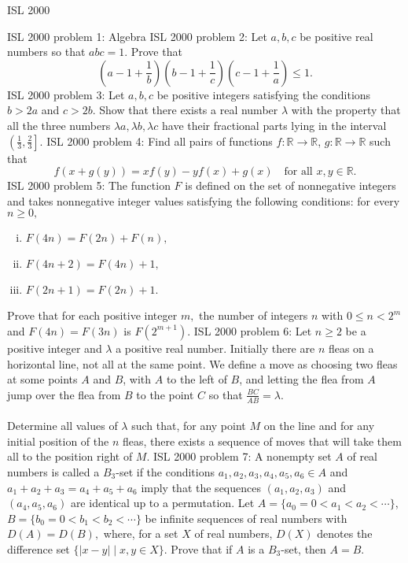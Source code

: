 ISL 2000 

ISL 2000 problem 1:  Algebra 
ISL 2000 problem 2:  Let $ a, b, c$ be positive real numbers so that $ abc = 1$. Prove that
\[
\left( a - 1 + \frac 1b \right) \left( b - 1 + \frac 1c \right) \left( c - 1 + \frac 1a \right) \leq 1.
\] 
ISL 2000 problem 3:  Let $ a, b, c$ be positive integers satisfying the conditions $ b > 2a$ and $ c > 2b.$ Show that there exists a real number $ \lambda$ with the property that all the three numbers $ \lambda a, \lambda b, \lambda c$ have their fractional parts lying in the interval $ \left(\frac {1}{3}, \frac {2}{3} \right].$ 
ISL 2000 problem 4:  Find all pairs of functions $ f : \mathbb R \to \mathbb R$, $g : \mathbb R \to \mathbb R$ such that
\[ f \left( x + g(y) \right) = xf(y) - y  f(x) + g(x) \quad\text{for all } x, y\in\mathbb{R}. \] 
ISL 2000 problem 5:  The function $ F$ is defined on the set of nonnegative integers and takes nonnegative integer values satisfying the following conditions: for every $ n \geq 0,$
\begin{enumerate}[(i)]
  \item $ F(4n) = F(2n) + F(n),$
  \item $ F(4n + 2) = F(4n) + 1,$
  \item $ F(2n + 1) = F(2n) + 1.$
\end{enumerate}
Prove that for each positive integer $ m,$ the number of integers $ n$ with $ 0 \leq n < 2^m$ and $ F(4n) = F(3n)$ is $ F(2^{m + 1}).$ 
ISL 2000 problem 6:  Let $ n \geq 2$ be a positive integer and $ \lambda$ a positive real number. Initially there are $ n$ fleas on a horizontal line, not all at the same point. We define a move as choosing two fleas at some points $ A$ and $ B$, with $ A$ to the left of $ B$, and letting the flea from $ A$ jump over the flea from $ B$ to the point $ C$ so that $ \frac {BC}{AB} = \lambda$. \\\\
Determine all values of $ \lambda$ such that, for any point $ M$ on the line and for any initial position of the $ n$ fleas, there exists a sequence of moves that will take them all to the position right of $ M$. 
ISL 2000 problem 7:  A nonempty set $ A$ of real numbers is called a $ B_3$-set if the conditions $ a_1, a_2, a_3, a_4, a_5, a_6 \in A$ and $ a_1 + a_2 + a_3 = a_4 + a_5 + a_6$ imply that the sequences $ (a_1, a_2, a_3)$ and $ (a_4, a_5, a_6)$ are identical up to a permutation. Let $A = \{a_0 = 0 < a_1 < a_2 < \cdots \}$, $B = \{b_0 = 0 < b_1 < b_2 < \cdots \}$ be infinite sequences of real numbers with $ D(A) = D(B),$ where, for a set $ X$ of real numbers, $ D(X)$ denotes the difference set $ \{|x-y|\mid x, y \in X \}.$ Prove that if $ A$ is a $ B_3$-set, then $ A = B.$ 
